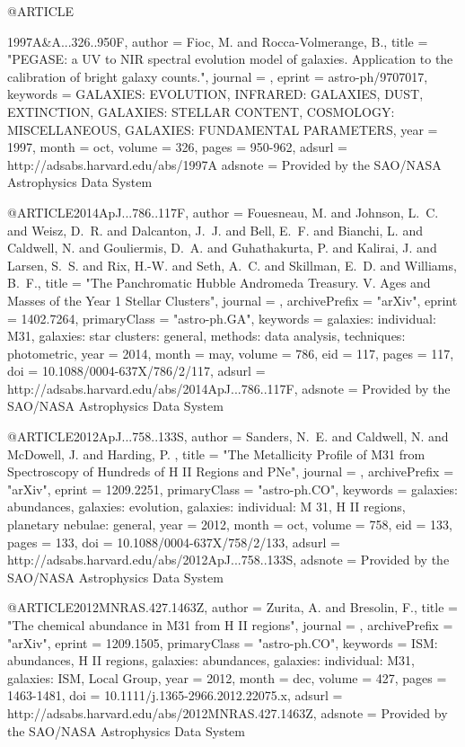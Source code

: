 @ARTICLE{1997A&A...326..950F,
   author = {{Fioc}, M. and {Rocca-Volmerange}, B.},
    title = "{PEGASE: a UV to NIR spectral evolution model of galaxies. Application to the calibration of bright galaxy counts.}",
  journal = {\aap},
   eprint = {astro-ph/9707017},
 keywords = {GALAXIES: EVOLUTION, INFRARED: GALAXIES, DUST, EXTINCTION, GALAXIES: STELLAR CONTENT, COSMOLOGY: MISCELLANEOUS, GALAXIES: FUNDAMENTAL PARAMETERS},
     year = 1997,
    month = oct,
   volume = 326,
    pages = {950-962},
   adsurl = {http://adsabs.harvard.edu/abs/1997A%
  adsnote = {Provided by the SAO/NASA Astrophysics Data System}
}

@ARTICLE{2014ApJ...786..117F,
   author = {{Fouesneau}, M. and {Johnson}, L.~C. and {Weisz}, D.~R. and 
	{Dalcanton}, J.~J. and {Bell}, E.~F. and {Bianchi}, L. and {Caldwell}, N. and 
	{Gouliermis}, D.~A. and {Guhathakurta}, P. and {Kalirai}, J. and 
	{Larsen}, S.~S. and {Rix}, H.-W. and {Seth}, A.~C. and {Skillman}, E.~D. and 
	{Williams}, B.~F.},
    title = "{The Panchromatic Hubble Andromeda Treasury. V. Ages and Masses of the Year 1 Stellar Clusters}",
  journal = {\apj},
archivePrefix = "arXiv",
   eprint = {1402.7264},
 primaryClass = "astro-ph.GA",
 keywords = {galaxies: individual: M31, galaxies: star clusters: general, methods: data analysis, techniques: photometric},
     year = 2014,
    month = may,
   volume = 786,
      eid = {117},
    pages = {117},
      doi = {10.1088/0004-637X/786/2/117},
   adsurl = {http://adsabs.harvard.edu/abs/2014ApJ...786..117F},
  adsnote = {Provided by the SAO/NASA Astrophysics Data System}
}

@ARTICLE{2012ApJ...758..133S,
   author = {{Sanders}, N.~E. and {Caldwell}, N. and {McDowell}, J. and {Harding}, P.
	},
    title = "{The Metallicity Profile of M31 from Spectroscopy of Hundreds of H II Regions and PNe}",
  journal = {\apj},
archivePrefix = "arXiv",
   eprint = {1209.2251},
 primaryClass = "astro-ph.CO",
 keywords = {galaxies: abundances, galaxies: evolution, galaxies: individual: M 31, H II regions, planetary nebulae: general},
     year = 2012,
    month = oct,
   volume = 758,
      eid = {133},
    pages = {133},
      doi = {10.1088/0004-637X/758/2/133},
   adsurl = {http://adsabs.harvard.edu/abs/2012ApJ...758..133S},
  adsnote = {Provided by the SAO/NASA Astrophysics Data System}
}

@ARTICLE{2012MNRAS.427.1463Z,
   author = {{Zurita}, A. and {Bresolin}, F.},
    title = "{The chemical abundance in M31 from H II regions}",
  journal = {\mnras},
archivePrefix = "arXiv",
   eprint = {1209.1505},
 primaryClass = "astro-ph.CO",
 keywords = {ISM: abundances, H II regions, galaxies: abundances, galaxies: individual: M31, galaxies: ISM, Local Group},
     year = 2012,
    month = dec,
   volume = 427,
    pages = {1463-1481},
      doi = {10.1111/j.1365-2966.2012.22075.x},
   adsurl = {http://adsabs.harvard.edu/abs/2012MNRAS.427.1463Z},
  adsnote = {Provided by the SAO/NASA Astrophysics Data System}
}

}
